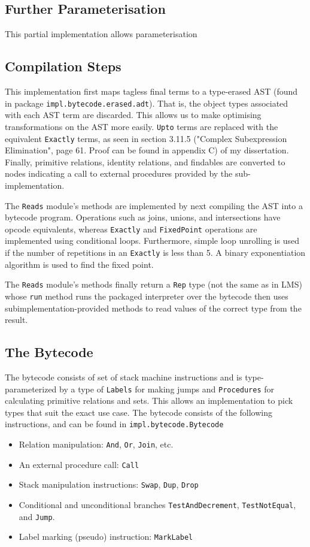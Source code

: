 \documentclass{report}
\newcommand \2[0]{\textbf{2}}
\newcommand \3[0]{\textbf{3}}
\begin{document}
\subsection{Further Parameterisation}
This partial implementation allows parameterisation

\subsection{Compilation Steps}
This implementation first maps tagless final terms to a type-erased AST (found in package \texttt{impl.bytecode.erased.adt}). That is, the object types associated with each AST term are discarded. This allows us to make optimising transformations on the AST more easily. \texttt{Upto} terms are replaced with the equivalent \texttt{Exactly} terms, as seen in section 3.11.5 ("Complex Subexpression Elimination", page 61. Proof can be found in appendix C) of my dissertation. Finally, primitive relations, identity relations, and findables are converted to nodes indicating a call to external procedures provided by the sub-implementation.

The \texttt{Reads} module's methods are implemented by next compiling the AST into a bytecode program. Operations such as joins, unions, and intersections have opcode equivalents, whereas \texttt{Exactly} and \texttt{FixedPoint} operations are implemented using conditional loops. Furthermore, simple loop unrolling is used if the number of repetitions in an \texttt{Exactly} is less than 5. A binary exponentiation algorithm is used to find the fixed point.

The \texttt{Reads} module's methods finally return a \texttt{Rep} type (not the same as in LMS) whose \texttt{run} method runs the packaged interpreter over the bytecode then uses subimplementation-provided methods to read values of the correct type from the result.


\subsection{The Bytecode}
The bytecode consists of set of stack machine instructions and is type-parameterized by a type of \texttt{Labels} for making jumps and \texttt{Procedures} for calculating primitive relations and sets. This allows an implementation to pick types that suit the exact use case. The bytecode consists of the following instructions, and can be found in \texttt{impl.bytecode.Bytecode}

\begin{itemize}
    \item Relation manipulation: \texttt{And}, \texttt{Or}, \texttt{Join}, etc.
    \item An external procedure call: \texttt{Call}
    \item Stack manipulation instructions: \texttt{Swap}, \texttt{Dup}, \texttt{Drop}
    \item Conditional and unconditional branches \texttt{TestAndDecrement}, \texttt{TestNotEqual}, and \texttt{Jump}.
    \item Label marking (pseudo) instruction: \texttt{MarkLabel}
\end{itemize}
\end{document}
